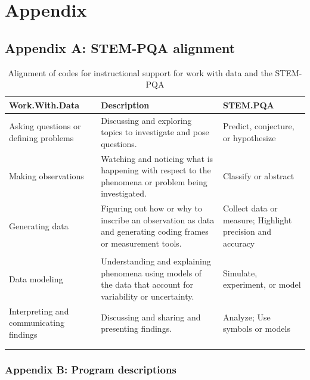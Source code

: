 \documentclass[]{msu-thesis}
\theoremstyle{definition}
\theoremstyle{definition}
\theoremstyle{definition}
\theoremstyle{remark}
\begin{document}
\chapter{Appendix}\label{appendix}

\section{Appendix A: STEM-PQA
alignment}\label{appendix-a-stem-pqa-alignment}

\begin{landscape}\begin{table}

\caption{\label{tab:unnamed-chunk-17}Alignment of codes for instructional support for work with data and the STEM-PQA}
\centering
\begin{tabular}[t]{lll}
\toprule
Work.With.Data & Description & STEM.PQA\\
\midrule
Asking questions or defining problems & Discussing and exploring topics to investigate and pose questions. & Predict, conjecture, or hypothesize\\
Making observations & Watching and noticing what is happening with respect to the phenomena or problem being investigated. & Classify or abstract\\
Generating data & Figuring out how or why to inscribe an observation as data and generating coding frames or measurement tools. & Collect data or measure; Highlight precision and accuracy\\
 &  & \\
Data modeling & Understanding and explaining phenomena using models of the data that account for variability or uncertainty. & Simulate, experiment, or model\\
Interpreting and communicating findings & Discussing and sharing and presenting findings. & Analyze; Use symbols or models\\
 &  & \\
 &  & \\
\bottomrule
\end{tabular}
\end{table}
\end{landscape}

\subsection{Appendix B: Program
descriptions}\label{appendix-b-program-descriptions}
\end{document}
